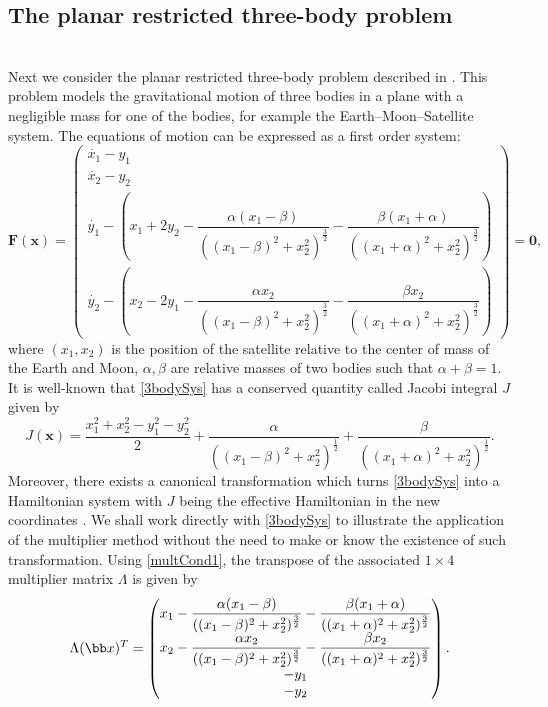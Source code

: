 \subsection{The planar restricted three-body problem} \vskip-2mm\label{sec:3bodyDisc}\text{ }\\
Next we consider the planar restricted three-body problem described in \cite{Sze67}. This problem models the gravitational motion of three bodies in a plane with a negligible mass for one of the bodies, for example the Earth--Moon--Satellite system. The equations of motion can be expressed as a first order system:
\begin{equation}
\boldsymbol F(\boldsymbol x) 
=
\begin{pmatrix}\dot{x_1} - y_1 \\
\dot{x_2} -y_2\\
\dot{y_1} -\left(x_1+2y_2-\dfrac{\alpha(x_1-\beta)}{((x_1-\beta)^2+x_2^2)^{\frac{3}{2}}}-\dfrac{\beta(x_1+\alpha)}{((x_1+\alpha)^2+x_2^2)^{\frac{3}{2}}}\right)\\
\dot{y_2} -\left(x_2-2y_1-\dfrac{\alpha x_2}{((x_1-\beta)^2+x_2^2)^{\frac{3}{2}}}-\dfrac{\beta x_2}{((x_1+\alpha)^2+x_2^2)^{\frac{3}{2}}}\right)\end{pmatrix}=\boldsymbol{0}, \label{3bodySys}
\end{equation}
where $(x_1,x_2)$ is the position of the satellite relative to the center of mass of the Earth and Moon, $\alpha, \beta$ are relative masses of two bodies such that $\alpha+\beta=1$. It is well-known that  \eqref{3bodySys} has a conserved quantity called Jacobi integral $J$ given by
\[
 J(\boldsymbol x)=\dfrac{x_1^2 + x_2^2- y_1^2-y_2^2}{2} + \dfrac{\alpha}{((x_1-\beta)^2+x_2^2)^{\frac{1}{2}}}+\dfrac{\beta}{((x_1+\alpha)^2+x_2^2)^{\frac{1}{2}}}.
\]Moreover, there exists a canonical transformation which turns \eqref{3bodySys} into a Hamiltonian system with $J$ being the effective Hamiltonian in the new coordinates \cite{Sze67}. We shall work directly with \eqref{3bodySys} to illustrate the application of the multiplier method without the need to make or know the existence of such transformation. Using \eqref{multCond1}, the transpose of the associated $1\times 4$ multiplier matrix $\Lambda$ is given by
\[
\Lambda(\bb x)^T = \begin{pmatrix} x_1-\dfrac{\alpha(x_1-\beta)}{((x_1-\beta)^2+x_2^2)^{\frac{3}{2}}}-\dfrac{\beta(x_1+\alpha)}{((x_1+\alpha)^2+x_2^2)^{\frac{3}{2}}} \\
 x_2-\dfrac{\alpha x_2}{((x_1-\beta)^2+x_2^2)^{\frac{3}{2}}}-\dfrac{\beta x_2}{((x_1+\alpha)^2+x_2^2)^{\frac{3}{2}}} \\
 -y_1 \\
 -y_2
\end{pmatrix}.
\]
